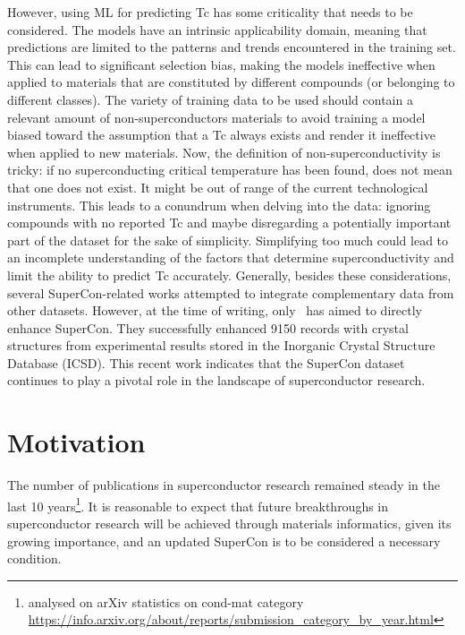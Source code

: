 However, using ML for predicting Tc has some criticality that needs to be considered. 
The models have an intrinsic applicability domain, meaning that predictions are limited to the patterns and trends encountered in the training set. 
This can lead to significant selection bias, making the models ineffective when applied to materials that are constituted by different compounds (or belonging to different classes). 
The variety of training data to be used should contain a relevant amount of non-superconductors materials to avoid training a model biased toward the assumption that a Tc always exists and render it ineffective when applied to new materials.
Now, the definition of non-superconductivity is tricky: if no superconducting critical temperature has been found, does not mean that one does not exist. It might be out of range of the current technological instruments. 
This leads to a conundrum when delving into the data: ignoring compounds with no reported Tc and maybe disregarding a potentially important part of the dataset for the sake of simplicity.
Simplifying too much could lead to an incomplete understanding of the factors that determine superconductivity and limit the ability to predict Tc accurately. 
Generally, besides these considerations, several SuperCon-related works attempted to integrate complementary data from other datasets. 
However, at the time of writing, only~\cite{sommer20223dsc} has aimed to directly enhance SuperCon.  
They successfully enhanced 9150 records with crystal structures from experimental results stored in the Inorganic Crystal Structure Database (ICSD). 
This recent work indicates that the SuperCon dataset continues to play a pivotal role in the landscape of superconductor research.

\section{Motivation}

The number of publications in superconductor research remained steady in the last 10 years\footnote{analysed on arXiv statistics on cond-mat category \url{https://info.arxiv.org/about/reports/submission_category_by_year.html}}.
It is reasonable to expect that future breakthroughs in superconductor research will be achieved through materials informatics, given its growing importance, and an updated SuperCon is to be considered a necessary condition. 

